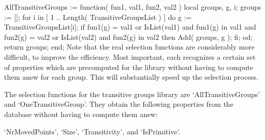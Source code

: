 \begintt
AllTransitiveGroups := function( fun1, val1, fun2, val2 )
local    groups, g, i;
  groups := [];
  for i  in [ 1 .. Length( TransitiveGroupsList ) ] do
    g := TransitiveGroupsList[i];
    if      fun1(g) = val1  or IsList(val1) and fun1(g) in val1
        and fun2(g) = val2  or IsList(val2) and fun2(g) in val2
     then
      Add( groups, g );
    fi;
  od;
  return groups;
end;
\endtt
Note that the real  selection functions are considerably  more difficult,
to improve the efficiency. Most  important, each recognizes a certain set
of properties which are precomputed for the library without having to
compute them anew for each group. This will substantially speed up the
selection process.

The selection functions for the transitive
groups library are `AllTransitiveGroups' and `OneTransitiveGroup'. They
obtain the following properties from the database without having to compute
them anew:

`NrMovedPoints', `Size',   `Transitivity', and `IsPrimitive'.

